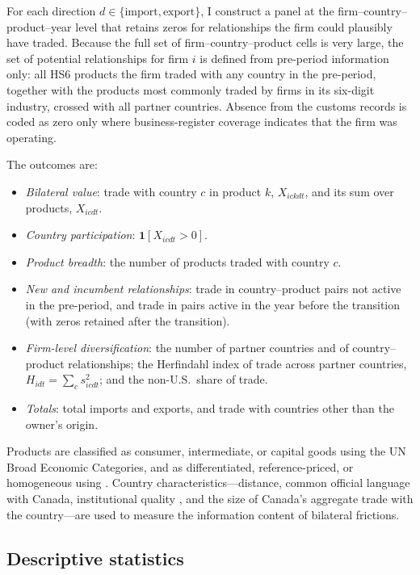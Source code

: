 \documentclass[12pt]{article}
\theoremstyle{remark}
\newcommand{\one}{\mathbf{1}}
\begin{document}
For each direction $d \in \{\text{import}, \text{export}\}$, I construct a
panel at the firm--country--product--year level that retains zeros for
relationships the firm could plausibly have traded. Because the full set of
firm--country--product cells is very large, the set of potential relationships
for firm $i$ is defined from pre-period information only: all HS6 products the
firm traded with any country in the pre-period, together with the products
most commonly traded by firms in its six-digit industry, crossed with all
partner countries. Absence from the customs records is coded as zero only
where business-register coverage indicates that the firm was operating.

The outcomes are:
\begin{itemize}[leftmargin=1.5em,itemsep=0.1em]
\item \emph{Bilateral value}: trade with country $c$ in product $k$, $X_{ickdt}$,
and its sum over products, $X_{icdt}$.
\item \emph{Country participation}: $\one[X_{icdt}>0]$.
\item \emph{Product breadth}: the number of products traded with country $c$.
\item \emph{New and incumbent relationships}: trade in country--product pairs
not active in the pre-period, and trade in pairs active in the year before the
transition (with zeros retained after the transition).
\item \emph{Firm-level diversification}: the number of partner countries and of
country--product relationships; the Herfindahl index of trade across partner
countries, $H_{idt} = \sum_c s_{icdt}^2$; and the non-U.S.\ share of trade.
\item \emph{Totals}: total imports and exports, and trade with countries other
than the owner's origin.
\end{itemize}

Products are classified as consumer, intermediate, or capital goods using the
UN Broad Economic Categories, and as differentiated, reference-priced, or
homogeneous using \citet{rauch1999}. Country characteristics---distance,
common official language with Canada, institutional quality
\citep{kaufmann2011}, and the size of Canada's aggregate trade with the
country---are used to measure the information content of bilateral frictions.

\subsection{Descriptive statistics}
\end{document}
